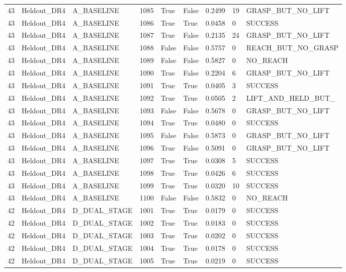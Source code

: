 \documentclass[11pt,a4paper,oneside]{book}
\begin{document}
\begin{longtable}{l l l l l l l l l}
43 & Heldout\_DR4 & A\_BASELINE & 1085 & True & False & 0.2499 & 19 & GRASP\_BUT\_NO\_LIFT \\
43 & Heldout\_DR4 & A\_BASELINE & 1086 & True & True & 0.0458 & 0 & SUCCESS \\
43 & Heldout\_DR4 & A\_BASELINE & 1087 & True & False & 0.2135 & 24 & GRASP\_BUT\_NO\_LIFT \\
43 & Heldout\_DR4 & A\_BASELINE & 1088 & False & False & 0.5757 & 0 & REACH\_BUT\_NO\_GRASP \\
43 & Heldout\_DR4 & A\_BASELINE & 1089 & False & False & 0.5827 & 0 & NO\_REACH \\
43 & Heldout\_DR4 & A\_BASELINE & 1090 & True & False & 0.2204 & 6 & GRASP\_BUT\_NO\_LIFT \\
43 & Heldout\_DR4 & A\_BASELINE & 1091 & True & True & 0.0405 & 3 & SUCCESS \\
43 & Heldout\_DR4 & A\_BASELINE & 1092 & True & True & 0.0505 & 2 & LIFT\_AND\_HELD\_BUT\_ \\
43 & Heldout\_DR4 & A\_BASELINE & 1093 & False & False & 0.5678 & 0 & GRASP\_BUT\_NO\_LIFT \\
43 & Heldout\_DR4 & A\_BASELINE & 1094 & True & True & 0.0480 & 0 & SUCCESS \\
43 & Heldout\_DR4 & A\_BASELINE & 1095 & False & False & 0.5873 & 0 & GRASP\_BUT\_NO\_LIFT \\
43 & Heldout\_DR4 & A\_BASELINE & 1096 & True & False & 0.5091 & 0 & GRASP\_BUT\_NO\_LIFT \\
43 & Heldout\_DR4 & A\_BASELINE & 1097 & True & True & 0.0308 & 5 & SUCCESS \\
43 & Heldout\_DR4 & A\_BASELINE & 1098 & True & True & 0.0426 & 6 & SUCCESS \\
43 & Heldout\_DR4 & A\_BASELINE & 1099 & True & True & 0.0320 & 10 & SUCCESS \\
43 & Heldout\_DR4 & A\_BASELINE & 1100 & False & False & 0.5832 & 0 & NO\_REACH \\
42 & Heldout\_DR4 & D\_DUAL\_STAGE & 1001 & True & True & 0.0179 & 0 & SUCCESS \\
42 & Heldout\_DR4 & D\_DUAL\_STAGE & 1002 & True & True & 0.0183 & 0 & SUCCESS \\
42 & Heldout\_DR4 & D\_DUAL\_STAGE & 1003 & True & True & 0.0202 & 0 & SUCCESS \\
42 & Heldout\_DR4 & D\_DUAL\_STAGE & 1004 & True & True & 0.0178 & 0 & SUCCESS \\
42 & Heldout\_DR4 & D\_DUAL\_STAGE & 1005 & True & True & 0.0219 & 0 & SUCCESS \\

\end{longtable}
\end{document}
